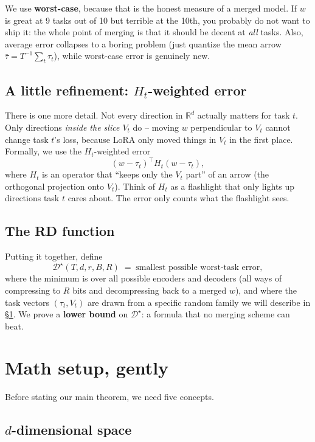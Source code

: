 \documentclass[11pt]{article}
\newcommand{\R}{\mathbb{R}}
\begin{document}
We use \textbf{worst-case}, because that is the honest measure of a
merged model. If $w$ is great at 9 tasks out of 10 but terrible at the
10th, you probably do not want to ship it: the whole point of merging
is that it should be decent at \emph{all} tasks. Also, average error
collapses to a boring problem (just quantize the mean arrow $\bar\tau
= T^{-1}\sum_t \tau_t$), while worst-case error is genuinely new.

\subsection{A little refinement: $H_t$-weighted error}

There is one more detail. Not every direction in $\R^d$ actually
matters for task $t$. Only directions \emph{inside the slice $V_t$}
do -- moving $w$ perpendicular to $V_t$ cannot change task $t$'s loss,
because LoRA only moved things in $V_t$ in the first place. Formally,
we use the $H_t$-weighted error
\[
  (w - \tau_t)^\top H_t (w - \tau_t),
\]
where $H_t$ is an operator that ``keeps only the $V_t$ part'' of an
arrow (the orthogonal projection onto $V_t$). Think of $H_t$ as a
flashlight that only lights up directions task $t$ cares about. The
error only counts what the flashlight sees.

\subsection{The RD function}

Putting it together, define
\[
  \mathcal{D}^\star(T,d,r,B,R)
  \;=\; \text{smallest possible worst-task error},
\]
where the minimum is over all possible encoders and decoders (all ways
of compressing to $R$ bits and decompressing back to a merged $w$), and
where the task vectors $(\tau_t, V_t)$ are drawn from a specific random
family we will describe in \S\ref{sec:setup}. We prove a
\textbf{lower bound} on $\mathcal{D}^\star$: a formula that no merging
scheme can beat.

\section{Math setup, gently}\label{sec:setup}

Before stating our main theorem, we need five concepts.

\subsection{$d$-dimensional space}
\end{document}
